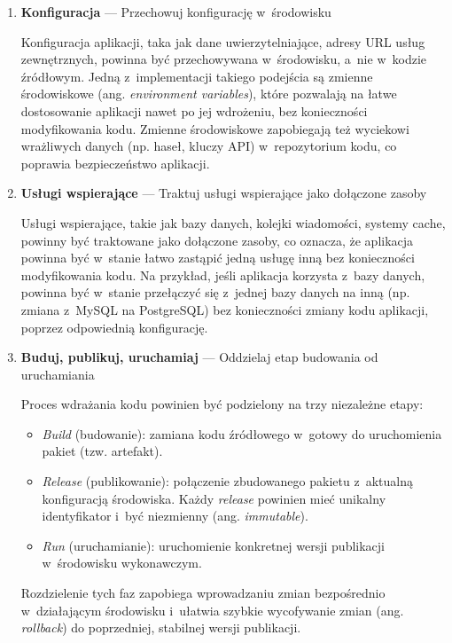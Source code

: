 \begin{enumerate}[label=\Roman*., font=\bfseries]
    \item \textbf{Konfiguracja} --- Przechowuj konfigurację w~środowisku

          Konfiguracja aplikacji, taka jak dane uwierzytelniające, adresy URL usług zewnętrznych, powinna być przechowywana w~środowisku, a~nie w~kodzie źródłowym.
          Jedną z~implementacji takiego podejścia są zmienne środowiskowe (ang. \textit{environment variables}), które pozwalają na łatwe dostosowanie aplikacji nawet po jej wdrożeniu, bez konieczności modyfikowania kodu.
          Zmienne środowiskowe zapobiegają też wyciekowi wrażliwych danych (np. haseł, kluczy API) w~repozytorium kodu, co poprawia bezpieczeństwo aplikacji.

    \item \textbf{Usługi wspierające} --- Traktuj usługi wspierające jako dołączone zasoby

          Usługi wspierające, takie jak bazy danych, kolejki wiadomości, systemy cache, powinny być traktowane jako dołączone zasoby,
          co oznacza, że aplikacja powinna być w~stanie łatwo zastąpić jedną usługę inną bez konieczności modyfikowania kodu.
          Na przykład, jeśli aplikacja korzysta z~bazy danych, powinna być w~stanie przełączyć się z~jednej bazy danych na inną (np. zmiana z~MySQL na PostgreSQL)
          bez konieczności zmiany kodu aplikacji, poprzez odpowiednią konfigurację.

    \item \textbf{Buduj, publikuj, uruchamiaj} --- Oddzielaj etap budowania od uruchamiania

          Proces wdrażania kodu powinien być podzielony na trzy niezależne etapy:
          \begin{itemize}
              \item \textit{Build} (budowanie): zamiana kodu źródłowego w~gotowy do uruchomienia pakiet (tzw. artefakt).
              \item \textit{Release} (publikowanie): połączenie zbudowanego pakietu z~aktualną konfiguracją środowiska. Każdy \textit{release} powinien mieć unikalny identyfikator i~być niezmienny (ang. \textit{immutable}).
              \item \textit{Run} (uruchamianie): uruchomienie konkretnej wersji publikacji w~środowisku wykonawczym.
          \end{itemize}
          Rozdzielenie tych faz zapobiega wprowadzaniu zmian bezpośrednio w~działającym środowisku i~ułatwia szybkie wycofywanie zmian (ang. \textit{rollback}) do poprzedniej, stabilnej wersji publikacji.


\end{enumerate}
